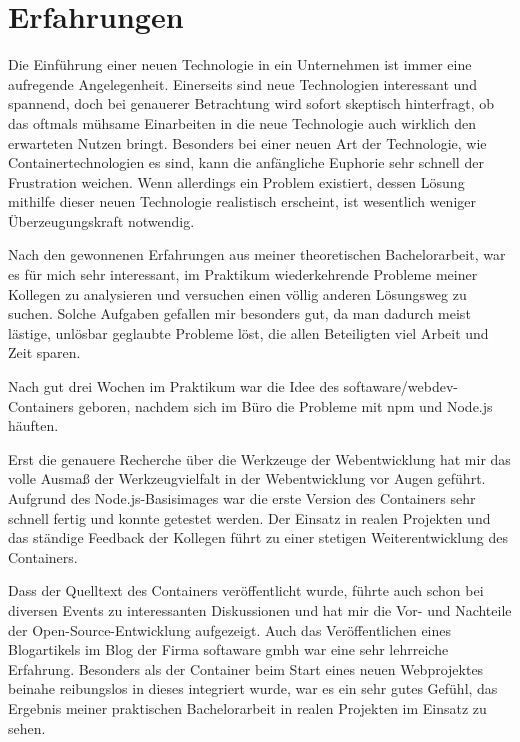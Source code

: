 \chapter{Erfahrungen}
\label{cha:experience}
Die Einführung einer neuen Technologie in ein Unternehmen ist immer eine aufregende Angelegenheit.
Einerseits sind neue Technologien interessant und spannend, doch bei genauerer Betrachtung wird sofort skeptisch hinterfragt, ob das oftmals mühsame Einarbeiten in die neue Technologie auch wirklich den erwarteten Nutzen bringt.
Besonders bei einer neuen Art der Technologie, wie Containertechnologien es sind, kann die anfängliche Euphorie sehr schnell der Frustration weichen.
Wenn allerdings ein Problem existiert, dessen Lösung mithilfe dieser neuen Technologie realistisch erscheint, ist wesentlich weniger Überzeugungskraft notwendig.

Nach den gewonnenen Erfahrungen aus meiner theoretischen Bachelorarbeit, war es für mich sehr interessant, im Praktikum wiederkehrende Probleme meiner Kollegen zu analysieren und versuchen einen völlig anderen Lösungsweg zu suchen.
Solche Aufgaben gefallen mir besonders gut, da man dadurch meist lästige, unlösbar geglaubte Probleme löst, die allen Beteiligten viel Arbeit und Zeit sparen.

Nach gut drei Wochen im Praktikum war die Idee des softaware/webdev-Containers geboren, nachdem sich im Büro die Probleme mit npm und Node.js häuften.

Erst die genauere Recherche über die Werkzeuge der Webentwicklung hat mir das volle Ausmaß der Werkzeugvielfalt in der Webentwicklung vor Augen geführt.
Aufgrund des Node.js-Basisimages war die erste Version des Containers sehr schnell fertig und konnte getestet werden.
Der Einsatz in realen Projekten und das ständige Feedback der Kollegen führt zu einer stetigen Weiterentwicklung des Containers.

Dass der Quelltext des Containers veröffentlicht wurde, führte auch schon bei diversen Events zu interessanten Diskussionen und hat mir die Vor- und Nachteile der Open-Source-Entwicklung aufgezeigt.
Auch das Veröffentlichen eines Blogartikels im Blog der Firma softaware gmbh war eine sehr lehrreiche Erfahrung.
Besonders als der Container beim Start eines neuen Webprojektes beinahe reibungslos in dieses integriert wurde, war es ein sehr gutes Gefühl, das Ergebnis meiner praktischen Bachelorarbeit in realen Projekten im Einsatz zu sehen.
